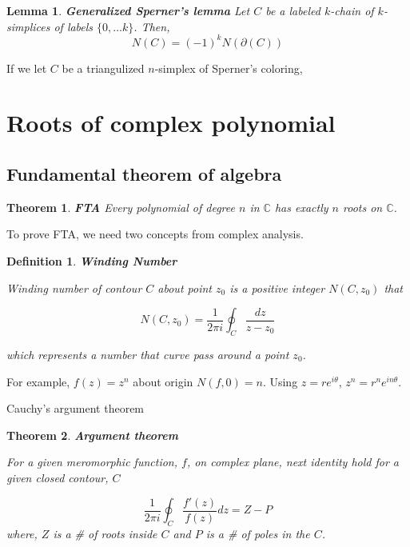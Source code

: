 \documentclass[a4paper,12pt]{article}
\newtheorem{theorem}{Theorem}
\newtheorem{lemma}{Lemma}
\newtheorem{definition}{Definition}
\begin{document}
\begin{lemma}\textbf{Generalized Sperner's lemma}
    \label{lemma:gen_sperner}
    Let $C$ be a labeled $k$-chain of $k$-simplices
    of labels $\{0, \dots k \}$. Then,
    \begin{equation}
        N(C) = (-1)^k N( \partial(C))
    \end{equation}
\end{lemma}

If we let $C$ be a triangulized $n$-simplex of Sperner's coloring, 

\section{Roots of complex polynomial}

\subsection{Fundamental theorem of algebra}

\begin{theorem} \textbf{FTA}
    Every polynomial of degree $n$ in $\mathbb{C}$ has exactly $n$ roots on $\mathbb{C}$.
\end{theorem}

To prove FTA, we need two concepts from complex analysis.

\begin{definition}\textbf{Winding Number\cite{Wind_Wolf}}

    Winding number of contour $C$ about point $z_0$ is a positive integer $N(C, z_0)$ that

    \begin{equation}
        N(C, z_0) = \frac{1}{2 \pi i} \oint_C \frac{dz}{z-z_0}
    \end{equation}

    which represents a number that curve pass around a point $z_0$.
\end{definition}

For example, $f(z) = z^n$ about origin $N(f, 0) = n$. 
Using $z = r e^{i \theta}$, $z^n = r^n e^{i n \theta}$.


Cauchy's argument theorem

\begin{theorem} \textbf{Argument theorem\cite{9736615}}
    \label{theorem:Argument}

    For a given meromorphic function, $f$, on complex plane, next identity hold for a given closed contour, $C$

    \begin{equation}
        \frac{1}{2 \pi i} \oint_{C} \frac{f'(z)}{f(z)} dz=  Z - P 
    \end{equation}
    where, $Z$ is a \# of roots inside $C$ and $P$ is a \# of poles in the $C$.
\end{theorem}
\end{document}
